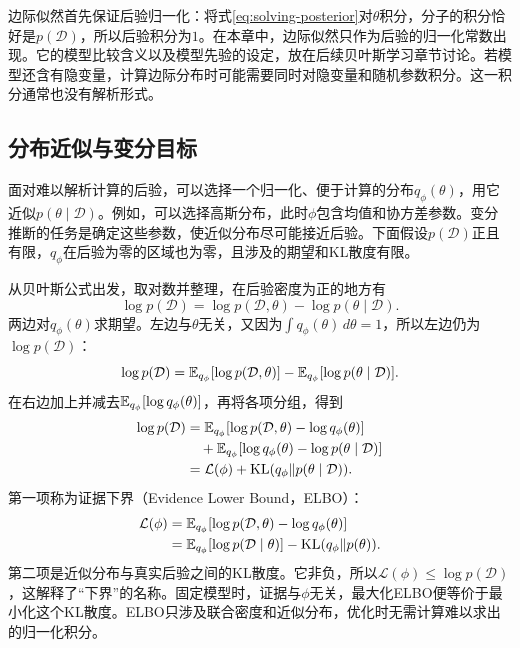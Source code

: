 边际似然首先保证后验归一化：将式\eqref{eq:solving-posterior}对$\theta$积分，分子的积分恰好是$p(\mathcal D)$，所以后验积分为$1$。在本章中，边际似然只作为后验的归一化常数出现。它的模型比较含义以及模型先验的设定，放在后续贝叶斯学习章节讨论。若模型还含有隐变量，计算边际分布时可能需要同时对隐变量和随机参数积分。这一积分通常也没有解析形式。

\subsection{分布近似与变分目标}
面对难以解析计算的后验，可以选择一个归一化、便于计算的分布$q_\phi(\theta)$，用它近似$p(\theta\mid\mathcal D)$。例如，可以选择高斯分布，此时$\phi$包含均值和协方差参数。变分推断的任务是确定这些参数，使近似分布尽可能接近后验。下面假设$p(\mathcal D)$正且有限，$q_\phi$在后验为零的区域也为零，且涉及的期望和KL散度有限。

从贝叶斯公式出发，取对数并整理，在后验密度为正的地方有
\begin{equation}
 \log p(\mathcal D)=\log p(\mathcal D,\theta)-\log p(\theta\mid\mathcal D).
\end{equation}
两边对$q_\phi(\theta)$求期望。左边与$\theta$无关，又因为$\int q_\phi(\theta)\,d\theta=1$，所以左边仍为$\log p(\mathcal D)$：
\begin{equation}
 \log p(\mathcal D)=\mathbb{E}_{q_\phi}[\log p(\mathcal D,\theta)]
 -\mathbb{E}_{q_\phi}[\log p(\theta\mid\mathcal D)].
\end{equation}
在右边加上并减去$\mathbb{E}_{q_\phi}[\log q_\phi(\theta)]$，再将各项分组，得到
\begin{align}
 \log p(\mathcal D)
 &=\mathbb{E}_{q_\phi}[\log p(\mathcal D,\theta)-\log q_\phi(\theta)]\notag\\
 &\quad+\mathbb{E}_{q_\phi}[\log q_\phi(\theta)-\log p(\theta\mid\mathcal D)]\notag\\
 &=\mathcal L(\phi)+\operatorname{KL}(q_\phi\|p(\theta\mid\mathcal D)).
 \label{eq:solving-vi-kl}
\end{align}
第一项称为证据下界（Evidence Lower Bound，ELBO）：
\begin{align}
 \mathcal L(\phi)
 &=\mathbb{E}_{q_\phi}[\log p(\mathcal D,\theta)-\log q_\phi(\theta)]\notag\\
 &=\mathbb{E}_{q_\phi}[\log p(\mathcal D\mid\theta)]-\operatorname{KL}(q_\phi\|p(\theta)).
 \label{eq:solving-elbo}
\end{align}
第二项是近似分布与真实后验之间的KL散度。它非负，所以$\mathcal L(\phi)\leq\log p(\mathcal D)$，这解释了“下界”的名称。固定模型时，证据与$\phi$无关，最大化ELBO便等价于最小化这个KL散度。ELBO只涉及联合密度和近似分布，优化时无需计算难以求出的归一化积分。

